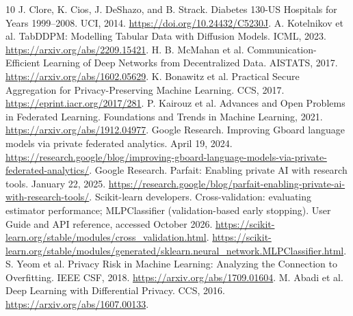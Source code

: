 \documentclass[10pt]{article}
\begin{document}
\clearpage
\begin{thebibliography}{10}
 J. Clore, K. Cios, J. DeShazo, and B. Strack.
Diabetes 130-US Hospitals for Years 1999--2008. UCI, 2014.
\url{https://doi.org/10.24432/C5230J}.
 A. Kotelnikov et al. TabDDPM: Modelling Tabular Data with Diffusion Models.
ICML, 2023. \url{https://arxiv.org/abs/2209.15421}.
 H. B. McMahan et al. Communication-Efficient Learning of Deep Networks
from Decentralized Data. AISTATS, 2017. \url{https://arxiv.org/abs/1602.05629}.
 K. Bonawitz et al. Practical Secure Aggregation for Privacy-Preserving
Machine Learning. CCS, 2017. \url{https://eprint.iacr.org/2017/281}.
 P. Kairouz et al. Advances and Open Problems in Federated Learning.
Foundations and Trends in Machine Learning, 2021. \url{https://arxiv.org/abs/1912.04977}.
 Google Research. Improving Gboard language models via private federated
analytics. April 19, 2024.
\url{https://research.google/blog/improving-gboard-language-models-via-private-federated-analytics/}.
 Google Research. Parfait: Enabling private AI with research tools.
January 22, 2025. \url{https://research.google/blog/parfait-enabling-private-ai-with-research-tools/}.
 Scikit-learn developers. Cross-validation: evaluating estimator performance;
MLPClassifier (validation-based early stopping). User Guide and API reference, accessed October 2026.
\url{https://scikit-learn.org/stable/modules/cross_validation.html}.
\url{https://scikit-learn.org/stable/modules/generated/sklearn.neural_network.MLPClassifier.html}.
 S. Yeom et al. Privacy Risk in Machine Learning:
Analyzing the Connection to Overfitting. IEEE CSF, 2018.
\url{https://arxiv.org/abs/1709.01604}.
 M. Abadi et al. Deep Learning with Differential Privacy.
CCS, 2016. \url{https://arxiv.org/abs/1607.00133}.
\end{thebibliography}
\end{document}
